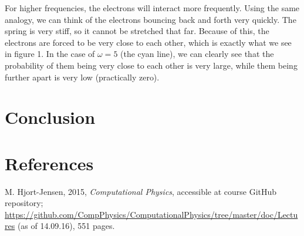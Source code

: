\documentclass[12pt]{article}
\begin{document}
For higher frequencies, the electrons will interact more frequently. Using the same analogy, we can think of the electrons bouncing back and forth very quickly. The spring is very stiff, so it cannot be stretched that far. Because of this, the electrons are forced to be very close to each other, which is exactly what we see in figure 1. In the case of $\omega = 5$ (the cyan line), we can clearly see that the probability of them being very close to each other is very large, while them being further apart is very low (practically zero).
\section{Conclusion}

\section{References}
M. Hjort-Jensen, 2015, \textit{Computational Physics}, accessible at course GitHub repository; \url{https://github.com/CompPhysics/ComputationalPhysics/tree/master/doc/Lectures} (as of 14.09.16), 551 pages.
\end{document}
